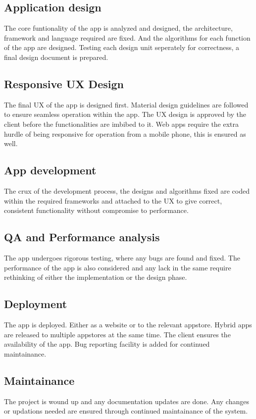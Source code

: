 \documentclass[a4paper,12pt]{report}
\begin{document}
			\subsection{Application design}
				The core funtionality of the app is analyzed and designed, the architecture, framework and language required are fixed. And the algorithms for each function of the app are designed. Testing each design unit seperately for correctness, a final design document is prepared.
			\subsection{Responsive UX Design}
				The final UX of the app is designed first. Material design guidelines are followed to ensure seamless operation within the app. The UX design is approved by the client before the functionalities are imbibed to it. Web apps require the extra hurdle of being responsive for operation from a mobile phone, this is ensured as well.
			\subsection{App development}
				The crux of the development process, the designs and algorithms fixed are coded within the required frameworks and attached to the UX to give correct, consistent functionality without compromise to performance. 
			\subsection{QA and Performance analysis}
				The app undergoes rigorous testing, where any bugs are found and fixed. The performance of the app is also considered and any lack in the same require rethinking of either the implementation or the design phase. 
			\subsection{Deployment}
				The app is deployed. Either as a website or to the relevant appstore. Hybrid apps are released to multiple appstores at the same time. The client ensures the availability of the app. Bug reporting facility is added for continued maintainance.
			\subsection{Maintainance}
				The project is wound up and any documentation updates are done. Any changes or updations needed are ensured through continued maintainance of the system.
\end{document}
